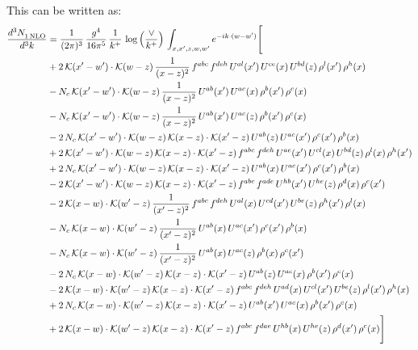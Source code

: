 \documentclass[9pt]{article}
\numberwithin{equation}{section}
\begin{document}
This can be written as:
\begin{align}
    \frac{d^{3}N_{1\,\rm NLO}^{\rm}}{d^{3}k}  & = \frac{1}{(2\pi)^{3}}\,\frac{g^{4}}{16\pi^{5}}\,\frac{1}{k^{+}}\,\log{\left(\frac{\vee}{k^{+}}\right)}\, \int_{x,x',z,w,w'}e^{-ik\cdot (w-w')}\Bigg[\notag\\ & +2\,\mathcal{K}(x'-w')\cdot\mathcal{K}(w-z)\,\frac{1}{(x-z)^{2}}\,f^{abc}\,f^{deh}\,U^{al}(x')\,U^{ce}(x)\,U^{bd}(z)\,\rho^{l}(x')\,\rho^{h}(x)\notag \\ 
&-N_{c}\,\mathcal{K}(x'-w')\cdot\mathcal{K}(w-z)\,\frac{1}{(x-z)^{2}}\,U^{ab}(x')\,U^{ac}(x)\,\rho^{b}(x')\,\rho^{c}(x)\notag \\ 
&-N_{c}\,\mathcal{K}(x'-w')\cdot\mathcal{K}(w-z)\,\frac{1}{(x-z)^{2}}\,U^{ab}(x')\,U^{ac}(z)\,\rho^{b}(x')\,\rho^{c}(x)\notag \\ 
&-2\,N_{c}\,\mathcal{K}(x'-w')\cdot\mathcal{K}(w-z)\,\mathcal{K}(x-z)\cdot\mathcal{K}(x'-z)\,U^{ab}(z)\,U^{ac}(x')\,\rho^{c}(x')\,\rho^{b}(x)\notag \\ 
&+2\,\mathcal{K}(x'-w')\cdot\mathcal{K}(w-z)\,\mathcal{K}(x-z)\cdot\mathcal{K}(x'-z)\,f^{abc}\,f^{deh}\,U^{ae}(x')\,U^{cl}(x)\,U^{bd}(z)\,\rho^{l}(x)\,\rho^{h}(x')\notag \\ 
&+2\,N_{c}\,\mathcal{K}(x'-w')\cdot\mathcal{K}(w-z)\,\mathcal{K}(x-z)\cdot\mathcal{K}(x'-z)\,U^{ab}(x)\,U^{ac}(x')\,\rho^{c}(x')\,\rho^{b}(x)\notag \\ 
&-2\,\mathcal{K}(x'-w')\cdot\mathcal{K}(w-z)\,\mathcal{K}(x-z)\cdot\mathcal{K}(x'-z)\,f^{abc}\,f^{ade}\,U^{hb}(x')\,U^{he}(z)\,\rho^{d}(x)\,\rho^{c}(x')\notag \\ 
&-2\,\mathcal{K}(x-w)\cdot\mathcal{K}(w'-z)\,\frac{1}{(x'-z)^{2}}\,f^{abc}\,f^{deh}\,U^{al}(x)\,U^{cd}(x')\,U^{be}(z)\,\rho^{h}(x')\,\rho^{l}(x)\notag \\ 
&-N_{c}\,\mathcal{K}(x-w)\cdot\mathcal{K}(w'-z)\,\frac{1}{(x'-z)^{2}}\,U^{ab}(x)\,U^{ac}(x')\,\rho^{c}(x')\,\rho^{b}(x)\notag \\ 
&-N_{c}\,\mathcal{K}(x-w)\cdot\mathcal{K}(w'-z)\,\frac{1}{(x'-z)^{2}}\,U^{ab}(x)\,U^{ac}(z)\,\rho^{b}(x)\,\rho^{c}(x')\notag \\ 
&-2\,N_{c}\,\mathcal{K}(x-w)\cdot\mathcal{K}(w'-z)\,\mathcal{K}(x-z)\cdot\mathcal{K}(x'-z)\,U^{ab}(z)\,U^{ac}(x)\,\rho^{b}(x')\,\rho^{c}(x)\notag \\ 
&-2\,\mathcal{K}(x-w)\cdot\mathcal{K}(w'-z)\,\mathcal{K}(x-z)\cdot\mathcal{K}(x'-z)\,f^{abc}\,f^{deh}\,U^{ad}(x)\,U^{cl}(x')\,U^{be}(z)\,\rho^{l}(x')\,\rho^{h}(x)\notag \\ 
&+2\,N_{c}\,\mathcal{K}(x-w)\cdot\mathcal{K}(w'-z)\,\mathcal{K}(x-z)\cdot\mathcal{K}(x'-z)\,U^{ab}(x')\,U^{ac}(x)\,\rho^{b}(x')\,\rho^{c}(x)\notag \\ 
&+2\,\mathcal{K}(x-w)\cdot\mathcal{K}(w'-z)\,\mathcal{K}(x-z)\cdot\mathcal{K}(x'-z)\,f^{abc}\,f^{dae}\,U^{hb}(x)\,U^{he}(z)\,\rho^{d}(x')\,\rho^{c}(x)\Bigg]
\end{align}
\end{document}
